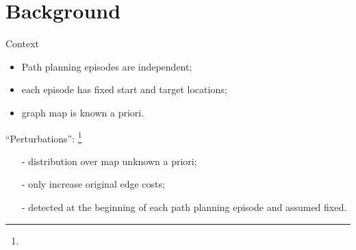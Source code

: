 \section*{Background}

\begin{frame}{Context}
    \begin{itemize}
        \item Path planning episodes are independent;
        \item each episode has fixed start and target locations;
        \item graph map is known a priori.
    \end{itemize}
    
    \medskip
    ``Perturbations'': \footnote{}
    \begin{itemize}
        \item[-] distribution over map unknown a priori;
        \item[-] only increase original edge costs;
        \item[-] detected at the beginning of each path planning episode and assumed fixed.
    \end{itemize}
\end{frame}

